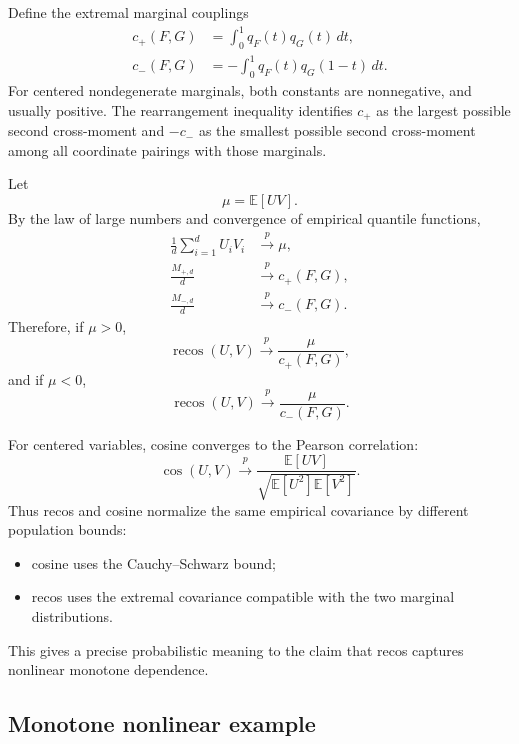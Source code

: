 \documentclass[11pt,a4paper]{article}
\newcommand{\E}{\mathbb{E}}
\newcommand{\recos}{\operatorname{recos}}
\newcommand{\cosim}{\operatorname{cos}}
\begin{document}
Define the extremal marginal couplings
\begin{align}
    c_+(F,G)
    &=\int_0^1 q_F(t)q_G(t)\,dt,\\
    c_-(F,G)
    &=-\int_0^1 q_F(t)q_G(1-t)\,dt.
\end{align}
For centered nondegenerate marginals, both constants are nonnegative, and usually positive. The rearrangement inequality identifies $c_+$ as the largest possible second cross-moment and $-c_-$ as the smallest possible second cross-moment among all coordinate pairings with those marginals.

Let
\begin{equation}
    \mu=\E[UV].
\end{equation}
By the law of large numbers and convergence of empirical quantile functions,
\begin{align}
    \frac{1}{d}\sum_{i=1}^d U_iV_i
    &\xrightarrow{p}\mu,\\
    \frac{M_{+,d}}{d}
    &\xrightarrow{p}c_+(F,G),\\
    \frac{M_{-,d}}{d}
    &\xrightarrow{p}c_-(F,G).
\end{align}
Therefore, if $\mu>0$,
\begin{equation}
    \recos(U,V)
    \xrightarrow{p}
    \frac{\mu}{c_+(F,G)},
\end{equation}
and if $\mu<0$,
\begin{equation}
    \recos(U,V)
    \xrightarrow{p}
    \frac{\mu}{c_-(F,G)}.
\end{equation}

For centered variables, cosine converges to the Pearson correlation:
\begin{equation}
    \cosim(U,V)
    \xrightarrow{p}
    \frac{\E[UV]}
    {\sqrt{\E[U^2]\E[V^2]}}.
\end{equation}
Thus recos and cosine normalize the same empirical covariance by different population bounds:
\begin{itemize}[leftmargin=2em]
    \item cosine uses the Cauchy--Schwarz bound;
    \item recos uses the extremal covariance compatible with the two marginal distributions.
\end{itemize}

This gives a precise probabilistic meaning to the claim that recos captures nonlinear monotone dependence.

\subsection{Monotone nonlinear example}
\end{document}
